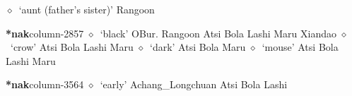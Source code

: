         $\diamond$~`aunt (father's sister)'
         Rangoon 
  \item {\footnotesize \textbf{*nak}}{\tiny column-2857}
         $\diamond$~`black'
         OBur. 
\hspace{1ex}
         Rangoon 
\hspace{1ex}
         Atsi 
\hspace{1ex}
         Bola 
\hspace{1ex}
         Lashi 
\hspace{1ex}
         Maru 
\hspace{1ex}
         Xiandao 
\hspace{1ex}
         $\diamond$~`crow'
         Atsi 
\hspace{1ex}
         Bola 
\hspace{1ex}
         Lashi 
\hspace{1ex}
         Maru 
\hspace{1ex}
         $\diamond$~`dark'
         Atsi 
\hspace{1ex}
         Bola 
\hspace{1ex}
         Maru 
\hspace{1ex}
         $\diamond$~`mouse'
         Atsi 
\hspace{1ex}
         Bola 
\hspace{1ex}
         Lashi 
\hspace{1ex}
         Maru 
  \item {\footnotesize \textbf{*nak}}{\tiny column-3564}
         $\diamond$~`early'
         Achang\_Longchuan 
\hspace{1ex}
         Atsi 
\hspace{1ex}
         Bola 
\hspace{1ex}
         Lashi 
\hspace{1ex}
